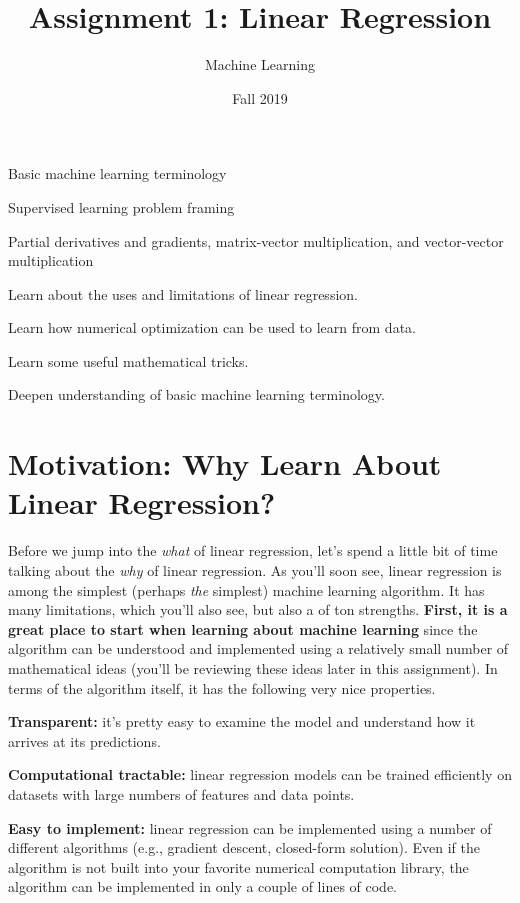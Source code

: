 \documentclass{tufte-handout}
\title{Assignment 1: Linear Regression}
\author{Machine Learning}
\date{Fall 2019}
\begin{document}
\maketitle
\thispagestyle{firstpage}

\begin{priorknowledge}

\bi
\item Basic machine learning terminology
\item Supervised learning problem framing
\item Partial derivatives and gradients, matrix-vector multiplication, and vector-vector multiplication
\ei
\end{priorknowledge}


\begin{learningobjectives}
\bi
\item Learn about the uses and limitations of linear regression.
\item Learn how numerical optimization can be used to learn from data.
\item Learn some useful mathematical tricks.
\item Deepen understanding of basic machine learning terminology.
\ei
\end{learningobjectives}

\section*{Motivation: Why Learn About Linear Regression?}

Before we jump into the \emph{what} of linear regression, let's spend a little bit of time talking about the \emph{why} of linear regression.  As you'll soon see, linear regression is among the simplest (perhaps \emph{the} simplest) machine learning algorithm.  It has many limitations, which you'll also see, but also a of ton strengths.  \textbf{First, it is a great place to start when learning about machine learning} since the algorithm can be understood and implemented using a relatively small number of mathematical ideas (you'll be reviewing these ideas later in this assignment).  In terms of the algorithm itself, it has the following very nice properties.

\bi
\item \textbf{Transparent:} it's pretty easy to examine the model and understand how it arrives at its predictions.
\item \textbf{Computational tractable:} linear regression models can be trained efficiently on datasets with large numbers of features and data points.
\item \textbf{Easy to implement:} linear regression can be implemented using a number of different algorithms (e.g., gradient descent, closed-form solution).  Even if the algorithm is not built into your favorite numerical computation library, the algorithm can be implemented in only a couple of lines of code.
\ei
\end{document}
